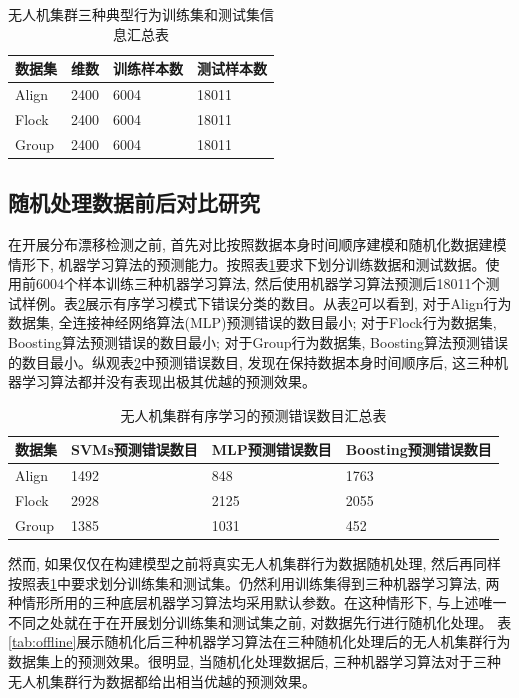 \begin{table}[]
\centering
\caption{无人机集群三种典型行为训练集和测试集信息汇总表}
\label{tab:train_test1}
\begin{tabular}{@{}llll@{}}
\toprule
数据集 & 维数  & 训练样本数 & 测试样本数  \\ \midrule
Align    & 2400 & 6004     & 18011 \\
Flock    & 2400 & 6004     & 18011 \\
Group    & 2400 & 6004     & 18011 \\ \bottomrule
\end{tabular}
\end{table}

\subsection{随机处理数据前后对比研究}

在开展分布漂移检测之前, 首先对比按照数据本身时间顺序建模和随机化数据建模情形下, 机器学习算法的预测能力。按照表\ref{tab:train_test1}要求下划分训练数据和测试数据。使用前6004个样本训练三种机器学习算法, 然后使用机器学习算法预测后18011个测试样例。表\ref{tab:online}展示有序学习模式下错误分类的数目。从表\ref{tab:online}可以看到, 对于Align行为数据集, 全连接神经网络算法(MLP)预测错误的数目最小; 对于Flock行为数据集, Boosting算法预测错误的数目最小; 对于Group行为数据集, Boosting算法预测错误的数目最小。纵观表\ref{tab:online}中预测错误数目, 发现在保持数据本身时间顺序后, 这三种机器学习算法都并没有表现出极其优越的预测效果。

\begin{table}[]
\centering
\caption{无人机集群有序学习的预测错误数目汇总表}
\label{tab:online}
\begin{tabular}{@{}llll@{}}
\toprule
数据集   & SVMs预测错误数目 & MLP预测错误数目 & Boosting预测错误数目 \\ \midrule
Align & 1492       & 848       & 1763           \\
Flock & 2928       & 2125      & 2055           \\
Group & 1385       & 1031      & 452            \\ \bottomrule
\end{tabular}%
\end{table}


然而, 如果仅仅在构建模型之前将真实无人机集群行为数据随机处理, 然后再同样按照表\ref{tab:train_test1}中要求划分训练集和测试集。仍然利用训练集得到三种机器学习算法, 两种情形所用的三种底层机器学习算法均采用默认参数。在这种情形下, 与上述唯一不同之处就在于在开展划分训练集和测试集之前, 对数据先行进行随机化处理。 表\ref{tab:offline}展示随机化后三种机器学习算法在三种随机化处理后的无人机集群行为数据集上的预测效果。很明显, 当随机化处理数据后, 三种机器学习算法对于三种无人机集群行为数据都给出相当优越的预测效果。

